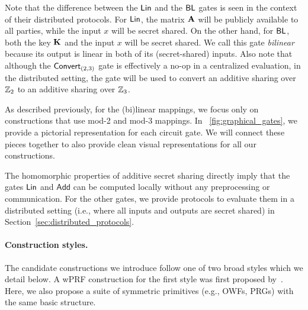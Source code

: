 \noindent Note that the difference between the $\textnormal{\textsf{Lin}}$ and the $\textnormal{\textsf{BL}}$ gates is seen in the context of their distributed protocols. For $\textnormal{\textsf{Lin}}$, the matrix $\mat{A}$ will be publicly available to all parties, while the input $x$ will be secret shared. On the other hand, for $\textnormal{\textsf{BL}}$, both the key $\mat{K}$ and the input $x$ will be secret shared. We call this gate \textit{bilinear} because its output is linear in both of its (secret-shared) inputs. Also note that although the $\textnormal{\textsf{Convert}}_{(2,3)}$ gate is effectively a no-op in a centralized evaluation, in the distributed setting, the gate will be used to convert an additive sharing over $\mathbb{Z}_2$ to an additive sharing over $\mathbb{Z}_3$.

As described previously, for the (bi)linear mappings, we focus only on constructions that use mod-2 and mod-3 mappings. In \fig~\ref{fig:graphical_gates}, we provide a pictorial representation for each circuit gate. We will connect these pieces together to also provide clean visual representations for all our constructions. 

The homomorphic properties of additive secret sharing directly imply that the gates $\textnormal{\textsf{Lin}}$ and $\textsf{Add}$ can be computed locally without any preprocessing or communication. For the other gates, we provide protocols to evaluate them in a distributed setting (i.e., where all inputs and outputs are secret shared) in Section~\ref{sec:distributed_protocols}.




\paragraph{Construction styles.}
The candidate constructions we introduce follow one of two broad styles which we detail below. A wPRF construction for the first style was first proposed by~\cite{boneh2018-darkmatter}. Here, we also propose a suite of symmetric primitives (e.g., OWFs, PRGs) with the same basic structure.


